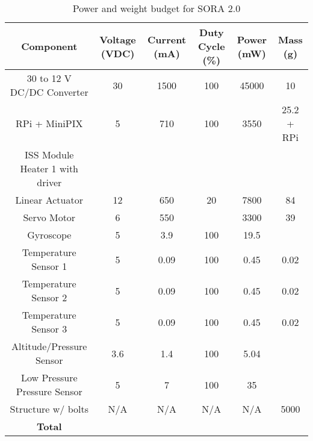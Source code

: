 \begin{table}[H]
  \centering
  \caption{Power and weight budget for SORA 2.0} 
  \label{tab:budget}
  \bigskip
  \begin{tabular}{cccccc}
    \hline
    \hline
    \multicolumn{1}{c}{\bfseries Component} & \multicolumn{1}{c}{\bfseries Voltage (VDC)} &  \multicolumn{1}{c}{\bfseries Current (mA)} & \multicolumn{1}{c}{\bfseries Duty Cycle (\%)} & \multicolumn{1}{c}{\bfseries Power (mW)} & \multicolumn{1}{c}{\bfseries Mass (g)} \\
    \hline
    30 to 12 V DC/DC Converter & 30 & 1500 & 100 & 45000 & 10 \\
    RPi + MiniPIX & 5 & 710 & 100 & 3550 & 25.2 + RPi \\    
    ISS Module Heater 1 with driver & & & & & \\
    Linear Actuator & 12 & 650 & 20 & 7800 & 84 \\
    Servo Motor & 6 & 550 & & 3300 & 39 \\
    Gyroscope & 5 & 3.9 & 100 & 19.5 & \\
    Temperature Sensor 1 & 5 & 0.09 & 100 & 0.45 & 0.02 \\
    Temperature Sensor 2 & 5 & 0.09 & 100 & 0.45 & 0.02 \\
    Temperature Sensor 3 & 5 & 0.09 & 100 & 0.45 & 0.02 \\
    Altitude/Pressure Sensor & 3.6 & 1.4 & 100 & 5.04 & \\
    Low Pressure Pressure Sensor & 5 & 7 & 100 & 35 & \\   
    
    Structure w/ bolts & N/A & N/A & N/A & N/A & 5000 \\
    \hline
    \textbf{Total} & \textbf{} & \textbf{} & \textbf{} & \textbf{} & \textbf{} \\
    \hline
    \hline
  \end{tabular}
  \medskip
\end{table}